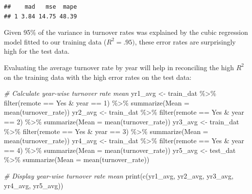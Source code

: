 \documentclass[
]{book}
\newenvironment{Shaded}{\begin{snugshade}}{\end{snugshade}}
\newcommand{\AttributeTok}[1]{\textcolor[rgb]{0.77,0.63,0.00}{#1}}
\newcommand{\CommentTok}[1]{\textcolor[rgb]{0.56,0.35,0.01}{\textit{#1}}}
\newcommand{\DecValTok}[1]{\textcolor[rgb]{0.00,0.00,0.81}{#1}}
\newcommand{\FunctionTok}[1]{\textcolor[rgb]{0.00,0.00,0.00}{#1}}
\newcommand{\NormalTok}[1]{#1}
\newcommand{\OtherTok}[1]{\textcolor[rgb]{0.56,0.35,0.01}{#1}}
\newcommand{\SpecialCharTok}[1]{\textcolor[rgb]{0.00,0.00,0.00}{#1}}
\newcommand{\StringTok}[1]{\textcolor[rgb]{0.31,0.60,0.02}{#1}}
\begin{document}
\begin{verbatim}
##    mad   mse  mape
## 1 3.84 14.75 48.39
\end{verbatim}

Given 95\% of the variance in turnover rates was explained by the cubic regression model fitted to our training data (\(R^2 = .95)\), these error rates are surprisingly high for the test data.

Evaluating the average turnover rate by year will help in reconciling the high \(R^2\) on the training data with the high error rates on the test data:

\begin{Shaded}
\begin{Highlighting}[]
\CommentTok{\# Calculate year{-}wise turnover rate mean}
\NormalTok{yr1\_avg }\OtherTok{\textless{}{-}}\NormalTok{ train\_dat }\SpecialCharTok{\%\textgreater{}\%} \FunctionTok{filter}\NormalTok{(remote }\SpecialCharTok{==} \StringTok{\textquotesingle{}Yes\textquotesingle{}} \SpecialCharTok{\&}\NormalTok{ year }\SpecialCharTok{==} \DecValTok{1}\NormalTok{) }\SpecialCharTok{\%\textgreater{}\%} \FunctionTok{summarize}\NormalTok{(}\AttributeTok{Mean =} \FunctionTok{mean}\NormalTok{(turnover\_rate))}
\NormalTok{yr2\_avg }\OtherTok{\textless{}{-}}\NormalTok{ train\_dat }\SpecialCharTok{\%\textgreater{}\%} \FunctionTok{filter}\NormalTok{(remote }\SpecialCharTok{==} \StringTok{\textquotesingle{}Yes\textquotesingle{}} \SpecialCharTok{\&}\NormalTok{ year }\SpecialCharTok{==} \DecValTok{2}\NormalTok{) }\SpecialCharTok{\%\textgreater{}\%} \FunctionTok{summarize}\NormalTok{(}\AttributeTok{Mean =} \FunctionTok{mean}\NormalTok{(turnover\_rate))}
\NormalTok{yr3\_avg }\OtherTok{\textless{}{-}}\NormalTok{ train\_dat }\SpecialCharTok{\%\textgreater{}\%} \FunctionTok{filter}\NormalTok{(remote }\SpecialCharTok{==} \StringTok{\textquotesingle{}Yes\textquotesingle{}} \SpecialCharTok{\&}\NormalTok{ year }\SpecialCharTok{==} \DecValTok{3}\NormalTok{) }\SpecialCharTok{\%\textgreater{}\%} \FunctionTok{summarize}\NormalTok{(}\AttributeTok{Mean =} \FunctionTok{mean}\NormalTok{(turnover\_rate))}
\NormalTok{yr4\_avg }\OtherTok{\textless{}{-}}\NormalTok{ train\_dat }\SpecialCharTok{\%\textgreater{}\%} \FunctionTok{filter}\NormalTok{(remote }\SpecialCharTok{==} \StringTok{\textquotesingle{}Yes\textquotesingle{}} \SpecialCharTok{\&}\NormalTok{ year }\SpecialCharTok{==} \DecValTok{4}\NormalTok{) }\SpecialCharTok{\%\textgreater{}\%} \FunctionTok{summarize}\NormalTok{(}\AttributeTok{Mean =} \FunctionTok{mean}\NormalTok{(turnover\_rate))}
\NormalTok{yr5\_avg }\OtherTok{\textless{}{-}}\NormalTok{ test\_dat }\SpecialCharTok{\%\textgreater{}\%} \FunctionTok{summarize}\NormalTok{(}\AttributeTok{Mean =} \FunctionTok{mean}\NormalTok{(turnover\_rate))}

\CommentTok{\# Display year{-}wise turnover rate mean}
\FunctionTok{print}\NormalTok{(}\FunctionTok{c}\NormalTok{(yr1\_avg, yr2\_avg, yr3\_avg, yr4\_avg, yr5\_avg))}
\end{Highlighting}
\end{Shaded}
\end{document}
